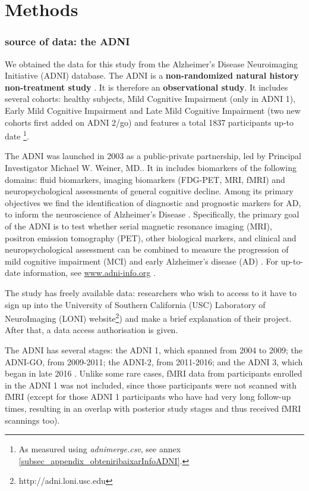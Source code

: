 \documentclass[a4paper,12pt]{elsarticle}  %
\begin{document}
\clearpage
\part{Methods}


\section{source of data: the ADNI} \label{sourceofdata} %

We obtained the data for this study from the Alzheimer's Disease Neuroimaging Initiative (ADNI) database. The ADNI is a \textbf{non-randomized natural history non-treatment study} \cite{adni2_protocol_extension}. It is therefore an \textbf{observational study}. It includes several cohorts: healthy subjects, Mild Cognitive Impairment (only in ADNI 1), Early Mild Cognitive Impairment and Late Mild Cognitive Impairment (two new cohorts first added on ADNI 2/go) and features a total 1837 participants up-to date \footnote{As measured using \textit{adnimerge.csv}, see annex \ref{subsec_appendix_obteniribaixarInfoADNI}.}.

The ADNI was launched in 2003 as a public-private partnership, led by Principal Investigator Michael W. Weiner, MD.\cite{adni_data_use_agreement}. It in includes biomarkers of the following domains: fluid biomarkers, imaging biomarkers (FDG-PET, MRI, fMRI) and neuropsychological assessments of general cognitive decline. Among its primary objectives we find the identification of diagnostic and prognostic markers for AD, to inform the neuroscience of Alzheimer's Disease \cite{adni2_protocol_extension}. Specifically, the primary goal of the ADNI is to test whether serial magnetic resonance imaging (MRI), positron emission tomography (PET),  other biological markers, and clinical and neuropsychological assessment can be combined to measure the progression of mild
cognitive impairment (MCI) and early Alzheimer’s disease (AD) \cite{adni_data_use_agreement}.  For up-to-date information, see \href{www.adni-info.org}{www.adni-info.org} \cite{adni_data_use_agreement}.



The study has freely available data: researchers who wish to access to it have to sign up into the University of Southern California (USC) Laboratory of NeuroImaging (LONI) website\footnote{http://adni.loni.usc.edu}) and make a brief explanation of their project.  After that, a data access authorisation is given. 

The ADNI has several stages: the ADNI 1, which spanned from 2004 to 2009; the ADNI-GO, from 2009-2011; the ADNI-2, from 2011-2016; and the ADNI 3, which began in late 2016 \cite{Protocol_ADNI3}. Unlike some rare cases, fMRI data from participants enrolled in the ADNI 1 was not included, since those participants were not scanned with fMRI (except for those ADNI 1 participants who have had very long follow-up times, resulting in an overlap with posterior study stages and thus received fMRI scannings too).
\end{document}
